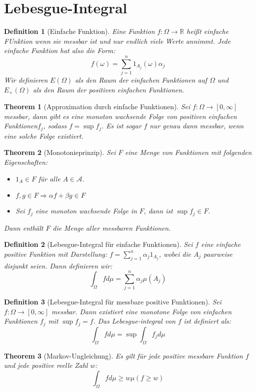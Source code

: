 \documentclass[10pt,a4paper]{article}
\newtheorem{theorem}{Theorem}
\newtheorem{definition}{Definition}
\begin{document}
\section{Lebesgue-Integral}
\begin{definition}[Einfache Funktion]
	Eine Funktion $f: \Omega \to \mathbb{R}$ heißt einfache FUnktion wenn sie messbar ist und nur endlich viele Werte annimmt. Jede einfache Funktion hat also die Form:
	$$f(\omega) = \sum_{j=1}^n1_{A_j}(\omega)\alpha_j$$
	Wir definieren $E(\Omega)$ als den Raum der einfachen Funktionen auf $\Omega$ und $E_+(\Omega)$ als den Raum der positiven einfachen Funktionen.
\end{definition}
\begin{theorem}[Approximation durch einfache Funktionen]
	Sei $f: \Omega \to [0, \infty]$ messbar, dann gibt es eine monoton wachsende Folge von positiven einfachen Funktionen$f_j$, sodass $f = \sup f_j$. Es ist sogar $f$ nur genau dann messbar, wenn eine solche Folge existiert. 
\end{theorem}
\begin{theorem}[Monotonieprinzip]
	Sei $F$ eine Menge von Funktionen mit folgenden Eigenschaften:
	\begin{itemize}
		\item $1_A \in F$ für alle $A\in \mathcal{A}$.
		\item $f,g \in F \Rightarrow \alpha f + \beta g \in F$
		\item Sei $f_j$ eine monoton wachsende Folge in $F$, dann ist $\sup f_j \in F$.
	\end{itemize}
	Dann enthält $F$ die Menge aller messbaren Funktionen.
\end{theorem}
\begin{definition}[Lebesgue-Integral für einfache Funktionen]
	Sei $f$ eine einfache positive Funktion mit Darstellung: $f = \sum_{j=1}^{n} \alpha_j1_{A_j}$, wobei die $A_j$ paarweise disjunkt seien. Dann definieren wir:
	$$\int_\Omega f d \mu = \sum_{j=1}^{n} \alpha_j\mu(A_j)$$
\end{definition}
\begin{definition}[Lebesgue-Integral für messbare positive Funktionen]
	Sei $f: \Omega \to [0, \infty]$ messbar. Dann existiert eine monotone Folge von einfachen Funktionen $f_j$ mit $\sup f_j =f$. Das Lebesgue-integral von $f$ ist definiert als:
	$$\int_\Omega f d\mu = \sup\int_\Omega f_j d\mu$$
\end{definition}
\begin{theorem}[Markov-Ungleichung]
	Es gilt für jede positive messbare Funktion $f$ und jede positive reelle Zahl $w$:
	$$\int_\Omega f d\mu \geq w \mu(f\geq w)$$
\end{theorem}
\end{document}
